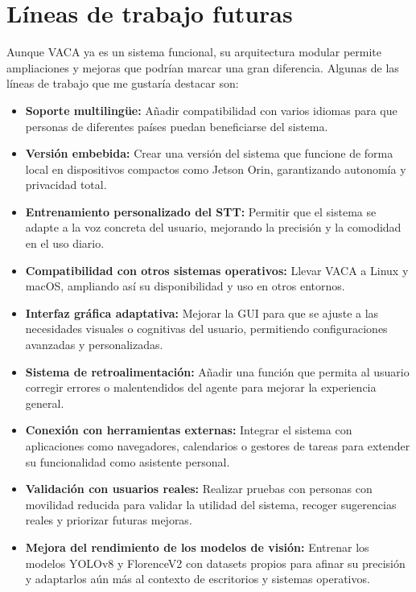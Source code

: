 \newpage

\section{Líneas de trabajo futuras}

Aunque VACA ya es un sistema funcional, su arquitectura modular permite ampliaciones y mejoras que podrían marcar una gran diferencia. Algunas de las líneas de trabajo que me gustaría destacar son:

\begin{itemize}
    \item \textbf{Soporte multilingüe:} Añadir compatibilidad con varios idiomas para que personas de diferentes países puedan beneficiarse del sistema.

    \item \textbf{Versión embebida:} Crear una versión del sistema que funcione de forma local en dispositivos compactos como Jetson Orin, garantizando autonomía y privacidad total.

    \item \textbf{Entrenamiento personalizado del STT:} Permitir que el sistema se adapte a la voz concreta del usuario, mejorando la precisión y la comodidad en el uso diario.

    \item \textbf{Compatibilidad con otros sistemas operativos:} Llevar VACA a Linux y macOS, ampliando así su disponibilidad y uso en otros entornos.

    \item \textbf{Interfaz gráfica adaptativa:} Mejorar la GUI para que se ajuste a las necesidades visuales o cognitivas del usuario, permitiendo configuraciones avanzadas y personalizadas.

    \item \textbf{Sistema de retroalimentación:} Añadir una función que permita al usuario corregir errores o malentendidos del agente para mejorar la experiencia general.

    \item \textbf{Conexión con herramientas externas:} Integrar el sistema con aplicaciones como navegadores, calendarios o gestores de tareas para extender su funcionalidad como asistente personal.

    \item \textbf{Validación con usuarios reales:} Realizar pruebas con personas con movilidad reducida para validar la utilidad del sistema, recoger sugerencias reales y priorizar futuras mejoras.

    \item \textbf{Mejora del rendimiento de los modelos de visión:} Entrenar los modelos YOLOv8 y FlorenceV2 con datasets propios para afinar su precisión y adaptarlos aún más al contexto de escritorios y sistemas operativos.
\end{itemize}
